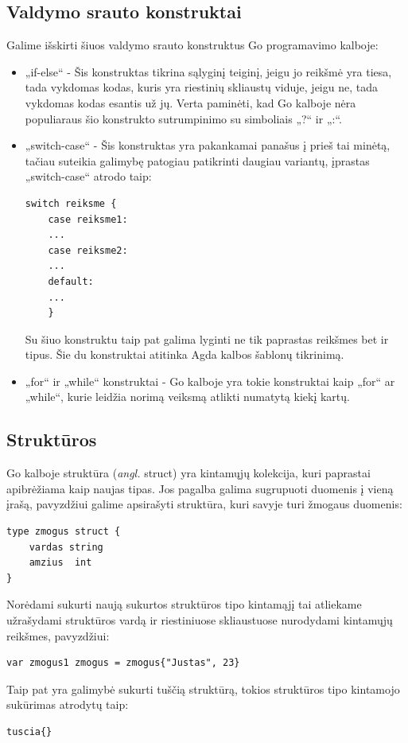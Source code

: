 \documentclass{VUMIFPSkursinis}
\begin{document}
\subsection{Valdymo srauto konstruktai}
Galime išskirti šiuos valdymo srauto konstruktus Go programavimo kalboje:
\begin{itemize}
	\item „if-else“ - Šis konstruktas tikrina sąlyginį teiginį, jeigu jo reikšmė yra tiesa, tada vykdomas kodas, kuris yra riestinių skliaustų viduje, jeigu ne, tada vykdomas kodas esantis už jų. Verta paminėti, kad Go kalboje nėra populiaraus šio konstrukto sutrumpinimo su simboliais „?“ ir „:“.
	\item {„switch-case“ - Šis konstruktas yra pakankamai panašus į prieš tai minėtą, tačiau suteikia galimybę patogiau patikrinti daugiau variantų, įprastas „switch-case“ atrodo taip:
	\begin{lstlisting}[language=GoCust]
switch reiksme {
	case reiksme1:
	...
	case reiksme2:
	...
	default:
	...
	}
	\end{lstlisting}
	Su šiuo konstruktu taip pat galima lyginti ne tik paprastas reikšmes bet ir tipus. Šie du konstruktai atitinka Agda kalbos šablonų tikrinimą.
	}
	\item „for“ ir „while“ konstruktai - Go kalboje yra tokie konstruktai kaip „for“ ar „while“, kurie leidžia norimą veiksmą atlikti numatytą kiekį kartų.
\end{itemize}
\subsection{Struktūros}
Go kalboje struktūra (\textit{angl.} struct) yra kintamųjų kolekcija, kuri paprastai apibrėžiama kaip naujas tipas. Jos pagalba galima sugrupuoti duomenis į vieną įrašą, pavyzdžiui galime apsirašyti struktūra, kuri savyje turi žmogaus duomenis:
\begin{lstlisting}[language=GoCust]
type zmogus struct {
	vardas string
	amzius  int
}
\end{lstlisting}
Norėdami sukurti naują sukurtos struktūros tipo kintamąjį tai atliekame užrašydami struktūros vardą ir riestiniuose skliaustuose nurodydami kintamųjų reikšmes, pavyzdžiui: 
\begin{lstlisting}[language=GoCust]
var zmogus1 zmogus = zmogus{"Justas", 23}
\end{lstlisting}
Taip pat yra galimybė sukurti tuščią struktūrą, tokios struktūros tipo kintamojo sukūrimas atrodytų taip: 
\begin{lstlisting}
tuscia{}
\end{lstlisting}
\end{document}
